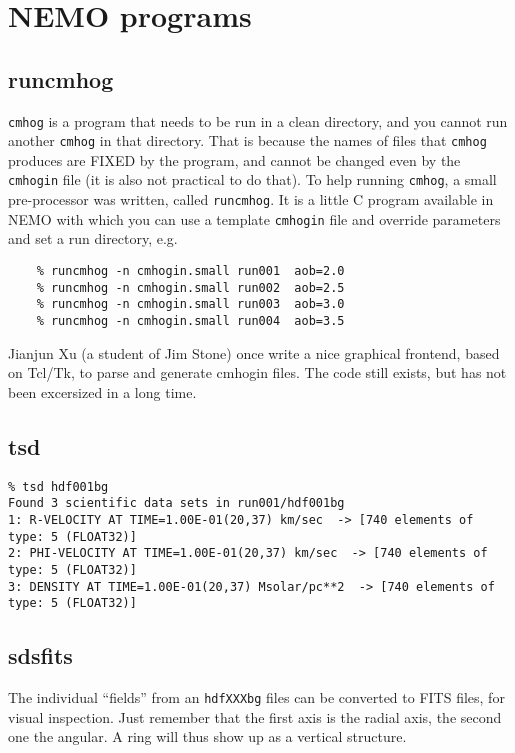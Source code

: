 \documentclass[11pt,epsf]{article}
\begin{document}
\section{NEMO programs}

\subsection{runcmhog}

{\tt cmhog} is a program that needs to be run in a clean directory, and you
cannot run another {\tt cmhog} in that directory. That is because the names
of files that {\tt cmhog} produces are FIXED by the program, and cannot be
changed even by the {\tt cmhogin} file (it is also not practical to do that).
To help running {\tt cmhog}, a small pre-processor was written, called
{\tt runcmhog}. It is a little C program available in NEMO with which you
can use a template {\tt cmhogin} file and override parameters and set
a run directory, e.g.

\begin{verbatim}
    % runcmhog -n cmhogin.small run001  aob=2.0
    % runcmhog -n cmhogin.small run002  aob=2.5
    % runcmhog -n cmhogin.small run003  aob=3.0
    % runcmhog -n cmhogin.small run004  aob=3.5
\end{verbatim}

Jianjun Xu (a student of Jim Stone) once write a nice graphical frontend,
based on Tcl/Tk, to parse and generate cmhogin files. The code still
exists, but has not been excersized in a long time.

\subsection{tsd}

\footnotesize\begin{verbatim}
% tsd hdf001bg 
Found 3 scientific data sets in run001/hdf001bg
1: R-VELOCITY AT TIME=1.00E-01(20,37) km/sec  -> [740 elements of type: 5 (FLOAT32)]
2: PHI-VELOCITY AT TIME=1.00E-01(20,37) km/sec  -> [740 elements of type: 5 (FLOAT32)]
3: DENSITY AT TIME=1.00E-01(20,37) Msolar/pc**2  -> [740 elements of type: 5 (FLOAT32)]
\end{verbatim}\normalsize

\subsection{sdsfits}

The individual ``fields'' from an {\tt hdfXXXbg} files can be converted to FITS files,
for visual inspection. Just remember that the first axis is the radial axis, the
second one the angular.  A ring will thus show up as a vertical structure.
\end{document}
